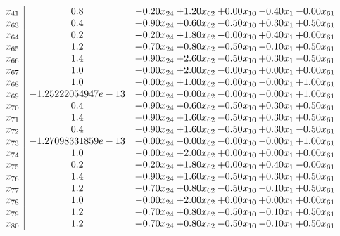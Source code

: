 \documentclass[8pt]{article}
\begin{document}
\[\begin{array}{c| c c@{\hskip 2pt} c@{\hskip 2pt} c@{\hskip 2pt} c@{\hskip 2pt} c@{\hskip 2pt} }
 x_{41}   &  0.8 & -0.20 x_{24} & +  1.20 x_{62} & +  0.00 x_{10} & -0.40 x_{1} & -0.00 x_{61}\\
 x_{63}   &  0.4 & +  0.90 x_{24} & +  0.60 x_{62} & -0.50 x_{10} & +  0.30 x_{1} & +  0.50 x_{61}\\
 x_{64}   &  0.2 & +  0.20 x_{24} & +  1.80 x_{62} & -0.00 x_{10} & +  0.40 x_{1} & +  0.00 x_{61}\\
 x_{65}   &  1.2 & +  0.70 x_{24} & +  0.80 x_{62} & -0.50 x_{10} & -0.10 x_{1} & +  0.50 x_{61}\\
 x_{66}   &  1.4 & +  0.90 x_{24} & +  2.60 x_{62} & -0.50 x_{10} & +  0.30 x_{1} & -0.50 x_{61}\\
 x_{67}   &  1.0 & +  0.00 x_{24} & +  2.00 x_{62} & -0.00 x_{10} & +  0.00 x_{1} & +  0.00 x_{61}\\
 x_{68}   &  1.0 & +  0.00 x_{24} & +  1.00 x_{62} & -0.00 x_{10} & -0.00 x_{1} & +  1.00 x_{61}\\
 x_{69}   &  -1.25222054947e-13 & +  0.00 x_{24} & -0.00 x_{62} & -0.00 x_{10} & -0.00 x_{1} & +  1.00 x_{61}\\
 x_{70}   &  0.4 & +  0.90 x_{24} & +  0.60 x_{62} & -0.50 x_{10} & +  0.30 x_{1} & +  0.50 x_{61}\\
 x_{71}   &  1.4 & +  0.90 x_{24} & +  1.60 x_{62} & -0.50 x_{10} & +  0.30 x_{1} & +  0.50 x_{61}\\
 x_{72}   &  0.4 & +  0.90 x_{24} & +  1.60 x_{62} & -0.50 x_{10} & +  0.30 x_{1} & -0.50 x_{61}\\
 x_{73}   &  -1.27098331859e-13 & +  0.00 x_{24} & -0.00 x_{62} & -0.00 x_{10} & -0.00 x_{1} & +  1.00 x_{61}\\
 x_{74}   &  1.0 & -0.00 x_{24} & +  2.00 x_{62} & +  0.00 x_{10} & +  0.00 x_{1} & +  0.00 x_{61}\\
 x_{75}   &  0.2 & +  0.20 x_{24} & +  1.80 x_{62} & +  0.00 x_{10} & +  0.40 x_{1} & -0.00 x_{61}\\
 x_{76}   &  1.4 & +  0.90 x_{24} & +  1.60 x_{62} & -0.50 x_{10} & +  0.30 x_{1} & +  0.50 x_{61}\\
 x_{77}   &  1.2 & +  0.70 x_{24} & +  0.80 x_{62} & -0.50 x_{10} & -0.10 x_{1} & +  0.50 x_{61}\\
 x_{78}   &  1.0 & -0.00 x_{24} & +  2.00 x_{62} & +  0.00 x_{10} & +  0.00 x_{1} & +  0.00 x_{61}\\
 x_{79}   &  1.2 & +  0.70 x_{24} & +  0.80 x_{62} & -0.50 x_{10} & -0.10 x_{1} & +  0.50 x_{61}\\
 x_{80}   &  1.2 & +  0.70 x_{24} & +  0.80 x_{62} & -0.50 x_{10} & -0.10 x_{1} & +  0.50 x_{61}\\

\end{array}\]
\end{document}
